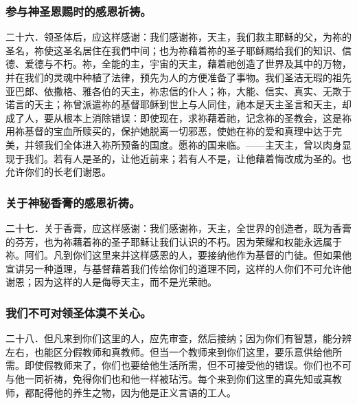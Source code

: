 
\subsubsection{参与神圣恩赐时的感恩祈祷。}

二十六．领圣体后，应这样感谢：我们感谢祢，天主，我们救主耶稣的父，为祢的圣名，祢使这圣名居住在我們中间；也为祢藉着祢的圣子耶稣赐给我们的知识、信德、爱德与不朽。祢，全能的主，宇宙的天主，藉着祂创造了世界及其中的万物，并在我们的灵魂中种植了法律，预先为人的方便准备了事物。我们圣洁无瑕的祖先亚巴郎、依撒格、雅各伯的天主，祢忠信的仆人；祢，大能、信实、真实、无欺于诺言的天主；祢曾派遣祢的基督耶稣到世上与人同住，祂本是天主圣言和天主，却成了人，要从根本上消除错误：即使现在，求祢藉着祂，记念祢的圣教会，这是祢用祢基督的宝血所赎买的，保护她脱离一切邪恶，使她在祢的爱和真理中达于完美，并领我们全体进入祢所预备的国度。愿祢的国来临。——主天主，曾以肉身显现于我们。若有人是圣的，让他近前来；若有人不是，让他藉着悔改成为圣的。也允许你们的长老们谢恩。\par


\subsubsection{关于神秘香膏的感恩祈祷。}

二十七．关于香膏，应这样感谢：我们感谢祢，天主，全世界的创造者，既为香膏的芬芳，也为祢藉着祢的圣子耶稣让我们认识的不朽。因为荣耀和权能永远属于祢。阿们。凡到你们这里来并这样感恩的人，要接纳他作为基督的门徒。但如果他宣讲另一种道理，与基督藉着我们传给你们的道理不同，这样的人你们不可允许他谢恩；因为这样的人是侮辱天主，而不是光荣祂。\par


\subsubsection{我们不可对领圣体漠不关心。}

二十八．但凡来到你们这里的人，应先审查，然后接纳；因为你们有智慧，能分辨左右，也能区分假教师和真教师。但当一个教师来到你们这里，要乐意供给他所需。即使假教师来了，你们也要给他生活所需，但不可接受他的错误。你们也不可与他一同祈祷，免得你们也和他一样被玷污。每个来到你们这里的真先知或真教师，都配得他的养生之物，因为他是正义言语的工人。\par

